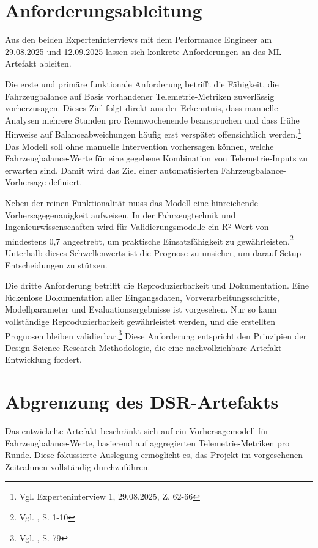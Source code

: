 \section{Anforderungsableitung}

Aus den beiden Experteninterviews mit dem Performance Engineer am 29.08.2025 und 12.09.2025 lassen sich konkrete Anforderungen an das \ac{ML}-Artefakt ableiten.

Die erste und primäre funktionale Anforderung betrifft die Fähigkeit, die Fahrzeugbalance auf Basis vorhandener Telemetrie-Metriken zuverlässig vorherzusagen. Dieses Ziel folgt direkt aus der Erkenntnis, dass manuelle Analysen mehrere Stunden pro Rennwochenende beanspruchen und dass frühe Hinweise auf Balanceabweichungen häufig erst verspätet offensichtlich werden.\footnote{Vgl. Experteninterview 1, 29.08.2025, Z. 62-66} Das Modell soll ohne manuelle Intervention vorhersagen können, welche Fahrzeugbalance-Werte für eine gegebene Kombination von Telemetrie-Inputs zu erwarten sind. Damit wird das Ziel einer automatisierten Fahrzeugbalance-Vorhersage definiert.

Neben der reinen Funktionalität muss das Modell eine hinreichende 
Vorhersagegenauigkeit aufweisen. In der Fahrzeugtechnik und 
Ingenieurwissenschaften wird für Validierungsmodelle ein R²-Wert 
von mindestens 0,7 angestrebt, um praktische Einsatzfähigkeit 
zu gewährleisten.\footnote{Vgl. \cite{ODonnell2024}, S. 1-10} 
Unterhalb dieses Schwellenwerts ist die Prognose zu unsicher, 
um darauf Setup-Entscheidungen zu stützen.

Die dritte Anforderung betrifft die Reproduzierbarkeit und Dokumentation. Eine lückenlose Dokumentation aller Eingangsdaten, Vorverarbeitungsschritte, Modellparameter und Evaluationsergebnisse ist vorgesehen. Nur so kann vollständige Reproduzierbarkeit gewährleistet werden, und die erstellten Prognosen bleiben validierbar.\footnote{Vgl. \cite{Venable2016}, S. 79} Diese Anforderung entspricht den Prinzipien der Design Science Research Methodologie, die eine nachvollziehbare Artefakt-Entwicklung fordert.

\section{Abgrenzung des DSR-Artefakts}

Das entwickelte Artefakt beschränkt sich auf ein Vorhersagemodell für Fahrzeugbalance-Werte, basierend auf aggregierten Telemetrie-Metriken pro Runde. Diese fokussierte Auslegung ermöglicht es, das Projekt im vorgesehenen Zeitrahmen vollständig durchzuführen.

